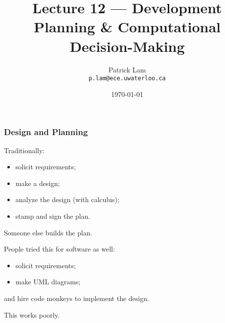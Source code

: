 

\title{Lecture 12 --- Development Planning \& Computational Decision-Making}

\author{Patrick Lam \\ \small \texttt{p.lam@ece.uwaterloo.ca}}
\date{\today}




\begin{frame}
  \titlepage
\end{frame}

\begin{frame}
\frametitle{Design and Planning}

\begin{changemargin}{1cm}

Traditionally:

\begin{itemize}
\item solicit requirements;
\item make a design;
\item analyze the design (with calculus);
\item stamp and sign the plan.
\end{itemize}
Someone else builds the plan.

People tried this for software as well:
\begin{itemize}
\item solicit requirements;
\item make UML diagrams; 
\end{itemize}
and hire code monkeys to implement the design.

This works poorly.

\end{changemargin}
\end{frame}


